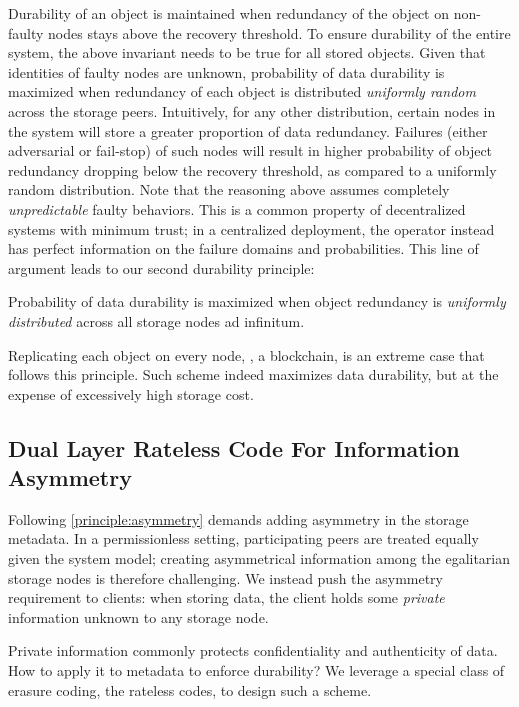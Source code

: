 Durability of an object is maintained when redundancy of the object on non-faulty nodes stays above the recovery threshold.
To ensure durability of the entire system, the above invariant needs to be true for all stored objects.
Given that identities of faulty nodes are unknown, probability of data durability is maximized when redundancy of each object is distributed \emph{uniformly random} across the storage peers.
Intuitively, for any other distribution, certain nodes in the system will store a greater proportion of data redundancy.
Failures (either adversarial or fail-stop) of such nodes will result in higher probability of object redundancy dropping below the recovery threshold, as compared to a uniformly random distribution.
Note that the reasoning above assumes completely \emph{unpredictable} faulty behaviors.
This is a common property of decentralized systems with minimum trust;
in a centralized deployment, the operator instead has perfect information on the failure domains and probabilities.
This line of argument leads to our second durability principle:

\begin{principle}
    Probability of data durability is maximized when object redundancy is \emph{uniformly distributed} across all storage nodes ad infinitum.
    \label{principle:uniformity}
\end{principle}

Replicating each object on every node, \eg, a blockchain, is an extreme case that follows this principle.
Such scheme indeed maximizes data durability, but at the expense of excessively high storage cost.

\subsection{Dual Layer Rateless Code For Information Asymmetry}
\label{sec:approach:code}

Following \autoref{principle:asymmetry} demands adding asymmetry in the storage metadata.
In a permissionless setting, participating peers are treated equally given the system model;
creating asymmetrical information among the egalitarian storage nodes is therefore challenging.
We instead push the asymmetry requirement to clients:
when storing data, the client holds some \emph{private} information unknown to any storage node.

Private information commonly protects confidentiality and authenticity of data.
How to apply it to metadata to enforce durability?
We leverage a special class of erasure coding, the rateless codes, to design such a scheme.

